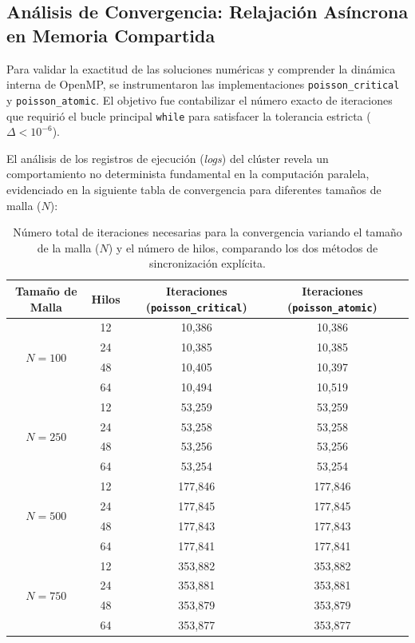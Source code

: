 \subsection{Análisis de Convergencia: Relajación Asíncrona en Memoria Compartida}

Para validar la exactitud de las soluciones numéricas y comprender la dinámica interna de OpenMP, se instrumentaron las implementaciones \texttt{poisson\_critical} y \texttt{poisson\_atomic}. El objetivo fue contabilizar el número exacto de iteraciones que requirió el bucle principal \texttt{while} para satisfacer la tolerancia estricta ($\Delta < 10^{-6}$).

El análisis de los registros de ejecución (\textit{logs}) del clúster revela un comportamiento no determinista fundamental en la computación paralela, evidenciado en la siguiente tabla de convergencia para diferentes tamaños de malla ($N$):

\begin{table}[H]
    \centering
    \begin{tabular}{|c|c|c|c|c|}
        \hline
        \textbf{Tamaño de Malla} & \textbf{Hilos} & \textbf{Iteraciones (\texttt{poisson\_critical})} & \textbf{Iteraciones (\texttt{poisson\_atomic})} \\ \hline
        \multirow{4}{*}{$N = 100$} 
        & 12 & 10,386 & 10,386 \\ \cline{2-4}
        & 24 & 10,385 & 10,385 \\ \cline{2-4}
        & 48 & 10,405 & 10,397 \\ \cline{2-4}
        & 64 & 10,494 & 10,519 \\ \hline
        \multirow{4}{*}{$N = 250$} 
        & 12 & 53,259 & 53,259 \\ \cline{2-4}
        & 24 & 53,258 & 53,258 \\ \cline{2-4}
        & 48 & 53,256 & 53,256 \\ \cline{2-4}
        & 64 & 53,254 & 53,254 \\ \hline
        \multirow{4}{*}{$N = 500$} 
        & 12 & 177,846 & 177,846 \\ \cline{2-4}
        & 24 & 177,845 & 177,845 \\ \cline{2-4}
        & 48 & 177,843 & 177,843 \\ \cline{2-4}
        & 64 & 177,841 & 177,841 \\ \hline
        \multirow{4}{*}{$N = 750$} 
        & 12 & 353,882 & 353,882 \\ \cline{2-4}
        & 24 & 353,881 & 353,881 \\ \cline{2-4}
        & 48 & 353,879 & 353,879 \\ \cline{2-4}
        & 64 & 353,877 & 353,877 \\ \hline
    \end{tabular}
    \caption{Número total de iteraciones necesarias para la convergencia variando el tamaño de la malla ($N$) y el número de hilos, comparando los dos métodos de sincronización explícita.}
    \label{tab:convergencia_iteraciones}
\end{table}

